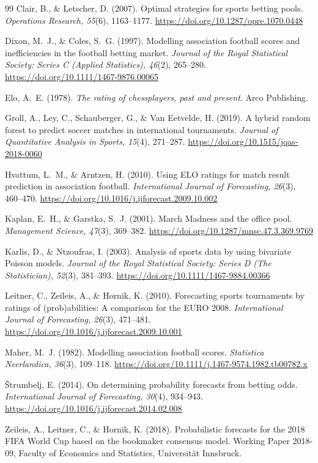 \documentclass[11pt,letterpaper]{article}
\begin{document}
\begin{thebibliography}{99}
Clair, B., \& Letscher, D. (2007). Optimal strategies for sports betting pools. \emph{Operations Research, 55}(6), 1163--1177. \url{https://doi.org/10.1287/opre.1070.0448}

Dixon, M.~J., \& Coles, S.~G. (1997). Modelling association football scores and inefficiencies in the football betting market. \emph{Journal of the Royal Statistical Society: Series C (Applied Statistics), 46}(2), 265--280. \url{https://doi.org/10.1111/1467-9876.00065}

Elo, A.~E. (1978). \emph{The rating of chessplayers, past and present}. Arco Publishing.

Groll, A., Ley, C., Schauberger, G., \& Van Eetvelde, H. (2019). A hybrid random forest to predict soccer matches in international tournaments. \emph{Journal of Quantitative Analysis in Sports, 15}(4), 271--287. \url{https://doi.org/10.1515/jqas-2018-0060}

Hvattum, L.~M., \& Arntzen, H. (2010). Using ELO ratings for match result prediction in association football. \emph{International Journal of Forecasting, 26}(3), 460--470. \url{https://doi.org/10.1016/j.ijforecast.2009.10.002}

Kaplan, E.~H., \& Garstka, S.~J. (2001). March Madness and the office pool. \emph{Management Science, 47}(3), 369--382. \url{https://doi.org/10.1287/mnsc.47.3.369.9769}

Karlis, D., \& Ntzoufras, I. (2003). Analysis of sports data by using bivariate Poisson models. \emph{Journal of the Royal Statistical Society: Series D (The Statistician), 52}(3), 381--393. \url{https://doi.org/10.1111/1467-9884.00366}

Leitner, C., Zeileis, A., \& Hornik, K. (2010). Forecasting sports tournaments by ratings of (prob)abilities: A comparison for the EURO 2008. \emph{International Journal of Forecasting, 26}(3), 471--481. \url{https://doi.org/10.1016/j.ijforecast.2009.10.001}

Maher, M.~J. (1982). Modelling association football scores. \emph{Statistica Neerlandica, 36}(3), 109--118. \url{https://doi.org/10.1111/j.1467-9574.1982.tb00782.x}

Štrumbelj, E. (2014). On determining probability forecasts from betting odds. \emph{International Journal of Forecasting, 30}(4), 934--943. \url{https://doi.org/10.1016/j.ijforecast.2014.02.008}

Zeileis, A., Leitner, C., \& Hornik, K. (2018). Probabilistic forecasts for the 2018 FIFA World Cup based on the bookmaker consensus model. Working Paper 2018-09, Faculty of Economics and Statistics, Universität Innsbruck.

\end{thebibliography}
\end{document}
